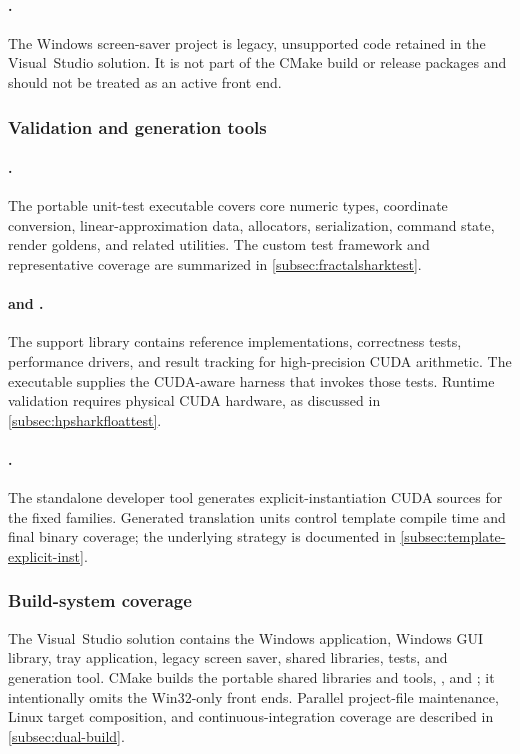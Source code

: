 \paragraph{.}
The Windows screen-saver project is legacy, unsupported code retained in the
Visual~Studio solution.  It is not part of the CMake build or release packages
and should not be treated as an active front end.

\subsubsection{Validation and generation tools}

\paragraph{.}
The portable unit-test executable covers core numeric types, coordinate
conversion, linear-approximation data, allocators, serialization, command
state, render goldens, and related utilities.  The custom test framework and
representative coverage are summarized in \cref{subsec:fractalsharktest}.

\paragraph{ and .}
The support library contains reference implementations, correctness tests,
performance drivers, and result tracking for high-precision CUDA arithmetic.
The executable supplies the CUDA-aware harness that invokes those tests.
Runtime validation requires physical CUDA hardware, as discussed in
\cref{subsec:hpsharkfloattest}.

\paragraph{.}
The standalone developer tool generates explicit-instantiation CUDA sources
for the fixed  families.  Generated translation units
control template compile time and final binary coverage; the underlying
strategy is documented in \cref{subsec:template-explicit-inst}.

\subsubsection{Build-system coverage}

The Visual~Studio solution contains the Windows application, Windows GUI
library, tray application, legacy screen saver, shared libraries, tests, and
generation tool.  CMake builds the portable shared libraries and tools,
, and ; it intentionally omits
the Win32-only front ends.  Parallel project-file maintenance, Linux target
composition, and continuous-integration coverage are described in
\cref{subsec:dual-build}.
